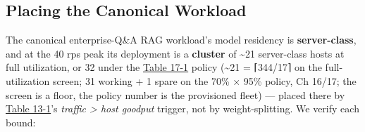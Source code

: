 
\label{worked-example}


\subsection{Placing the Canonical
Workload}\label{placing-the-canonical-workload}

The canonical enterprise-Q\&A RAG workload's model residency is
\textbf{server-class}, and at the 40 rps peak its deployment is a
\textbf{cluster} of \textasciitilde21 server-class hosts at full
utilization, or 32 under the \hyperref[tab:17.1]{Table 17-1} policy (\textasciitilde21 =
⌈344/17⌉ on the full-utilization screen; 31 working + 1 spare on the
70\% × 95\% policy, Ch 16/17; the screen is a floor, the policy number
is the provisioned fleet) --- placed there by \hyperref[tab:13.1]{Table 13-1}'s \emph{traffic
\textgreater{} host goodput} trigger, not by weight-splitting. We verify
each bound:

